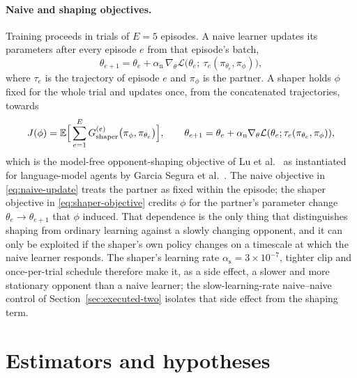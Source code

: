 \paragraph{Naive and shaping objectives.}
Training proceeds in trials of \(E = 5\) episodes.
A naive learner updates its parameters after every episode \(e\) from
that episode's batch,
\begin{equation}
  \theta_{e+1} = \theta_e + \alpha_{\mathrm{n}}\, \nabla_{\theta}
  \mathcal{L}\bigl(\theta_e;\ \tau_e(\pi_{\theta_e}, \pi_{\phi})\bigr),
  \label{eq:naive-update}
\end{equation}
where \(\tau_e\) is the trajectory of episode \(e\) and \(\pi_{\phi}\) is
the partner.
A shaper holds \(\phi\) fixed for the whole trial and updates once, from
the concatenated trajectories, towards
\begin{equation}
  J(\phi) = \mathbb{E}\Bigl[\, \sum_{e=1}^{E} G_{\mathrm{shaper}}^{(e)}
  \bigl(\pi_{\phi}, \pi_{\theta_e}\bigr) \Bigr],
  \qquad \theta_{e+1} = \theta_e + \alpha_{\mathrm{n}} \nabla_{\theta}
  \mathcal{L}(\theta_e; \tau_e(\pi_{\theta_e}, \pi_{\phi})),
  \label{eq:shaper-objective}
\end{equation}
which is the model-free opponent-shaping objective of Lu et al.\
\cite{lu2022} as instantiated for language-model agents by Garcia Segura
et al.\ \cite{garciasegura2025}.
The naive objective in \eqref{eq:naive-update} treats the partner as
fixed within the episode; the shaper objective in
\eqref{eq:shaper-objective} credits \(\phi\) for the partner's parameter
change \(\theta_{e} \to \theta_{e+1}\) that \(\phi\) induced.
That dependence is the only thing that distinguishes shaping from
ordinary learning against a slowly changing opponent, and it can only be
exploited if the shaper's own policy changes on a timescale at which the
naive learner responds.
The shaper's learning rate \(\alpha_{\mathrm{s}} = 3 \times 10^{-7}\),
tighter clip and once-per-trial schedule therefore make it, as a side
effect, a slower and more stationary opponent than a naive learner; the
slow-learning-rate naive--naive control of Section~\ref{sec:executed-two}
isolates that side effect from the shaping term.

\section{Estimators and hypotheses}
\label{sec:estimators}

